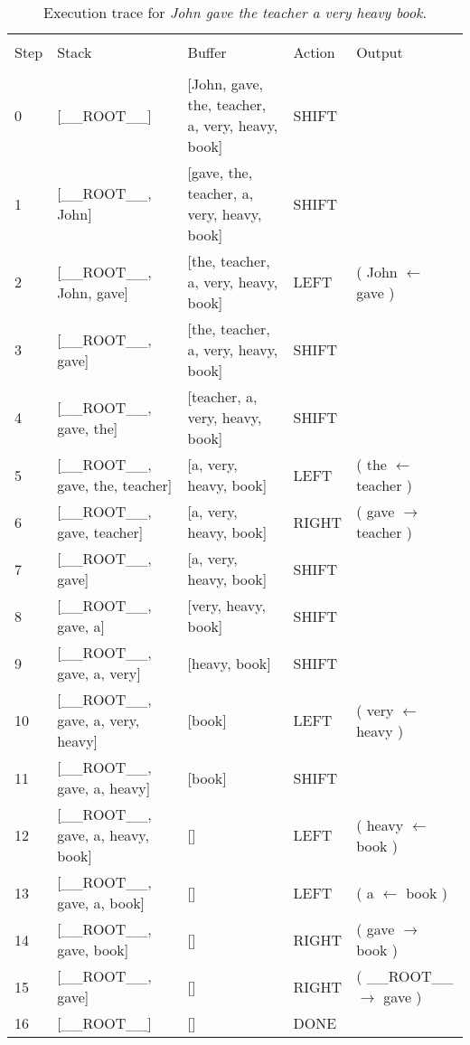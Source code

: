 \documentclass[
12pt,
a4paper,
oneside,
headinclude,
footinclude]{article}
\begin{document}
    \begin{center}
    \begin{table}[H]   
        \hspace*{-2.0cm}
        \begin{tabular}{l p{5cm} p{5cm} l l} %
            \hline
            \hline 
            \\[-1.5ex]
            \textcolor{BrickRed}{Step} & \textcolor{BrickRed}{Stack} & \textcolor{BrickRed}{Buffer} & \textcolor{BrickRed}{Action} & \textcolor{BrickRed}{Output}\\ [0.5ex]
            \hline %
            \\[-1.5ex]
            0 & [\_\_ROOT\_\_] & [John, gave, the, teacher, a, very, heavy, book] & SHIFT & \\ 
            1 & [\_\_ROOT\_\_, John] & [gave, the, teacher, a, very, heavy, book] & SHIFT & \\ 
            2 & [\_\_ROOT\_\_, John, gave] & [the, teacher, a, very, heavy, book] & LEFT & ( John $\leftarrow$ gave )\\ 
            3 & [\_\_ROOT\_\_, gave] & [the, teacher, a, very, heavy, book] & SHIFT & \\ 
            4 & [\_\_ROOT\_\_, gave, the] & [teacher, a, very, heavy, book] & SHIFT & \\ 
            5 & [\_\_ROOT\_\_, gave, the, teacher] & [a, very, heavy, book] & LEFT & ( the $\leftarrow$ teacher )\\ 
            6 & [\_\_ROOT\_\_, gave, teacher] & [a, very, heavy, book] & RIGHT & ( gave $\rightarrow$ teacher )\\ 
            7 & [\_\_ROOT\_\_, gave] & [a, very, heavy, book] & SHIFT & \\ 
            8 & [\_\_ROOT\_\_, gave, a] & [very, heavy, book] & SHIFT & \\ 
            9 & [\_\_ROOT\_\_, gave, a, very] & [heavy, book] & SHIFT & \\ 
            10 & [\_\_ROOT\_\_, gave, a, very, heavy] & [book] & LEFT & ( very $\leftarrow$ heavy )\\ 
            11 & [\_\_ROOT\_\_, gave, a, heavy] & [book] & SHIFT & \\ 
            12 & [\_\_ROOT\_\_, gave, a, heavy, book] & [] & LEFT & ( heavy $\leftarrow$ book )\\ 
            13 & [\_\_ROOT\_\_, gave, a, book] & [] & LEFT & ( a $\leftarrow$ book )\\ 
            14 & [\_\_ROOT\_\_, gave, book] & [] & RIGHT & ( gave $\rightarrow$ book )\\ 
            15 & [\_\_ROOT\_\_, gave] & [] & RIGHT & ( \_\_ROOT\_\_ $\rightarrow$ gave )\\ 
            16 & [\_\_ROOT\_\_] & [] & DONE &           
            \\[1ex] %
            \hline %
        \end{tabular}
        \caption{\label{tab:trace-2}Execution trace for \textit{John gave the teacher a very heavy book}.}
    \end{table} 
    \end{center}
    
\end{document}
